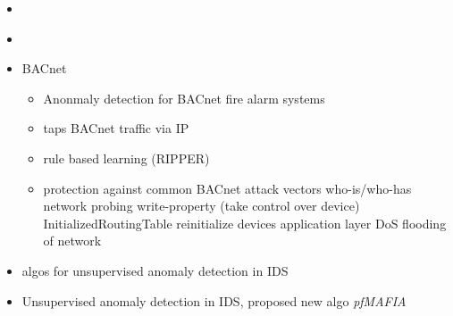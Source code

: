 

\begin{itemize}
	\item \parencite{Yang2006}
	\item \parencite{Celeda2012}
	\item \textcite{Pan2014} BACnet
	\begin{itemize}
		\item Anonmaly detection for BACnet fire alarm systems
		\item taps BACnet traffic via IP
		\item rule based learning (RIPPER)
		\item protection against common BACnet attack vectors
		\subitem who-is/who-has network probing
		\subitem write-property (take control over device)
		\subitem InitializedRoutingTable
		\subitem reinitialize devices
		\subitem application layer DoS
		\subitem flooding of network
	\end{itemize}
	
	\item \textcite{Eskin2002} algos for unsupervised anomaly detection in IDS
	\item \textcite{Leung2005} Unsupervised anomaly detection in IDS, proposed new algo \emph{pfMAFIA}
\end{itemize}